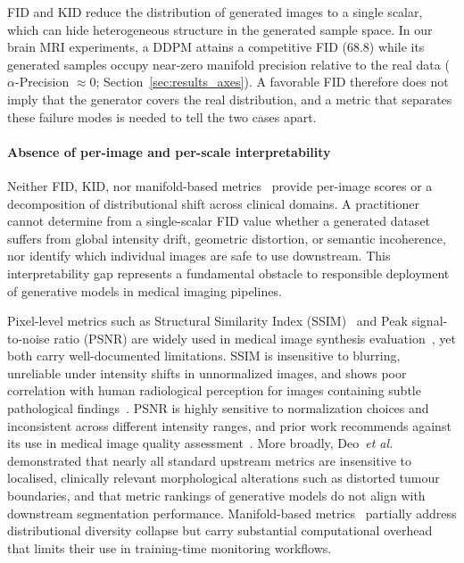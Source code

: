 \documentclass[lettersize,journal]{IEEEtran}
\begin{document}
FID and KID reduce the distribution of generated images to a single scalar, which can hide heterogeneous structure in the generated sample space. In our brain MRI experiments, a DDPM attains a competitive FID ($68.8$) while its generated samples occupy near-zero manifold precision relative to the real data ($\alpha$-Precision $\approx 0$; Section~\ref{sec:results_axes}). A favorable FID therefore does not imply that the generator covers the real distribution, and a metric that separates these failure modes is needed to tell the two cases apart.

\paragraph{Absence of per-image and per-scale interpretability}
Neither FID, KID, nor manifold-based
metrics~\cite{kynkaanniemi2019pr,naeem2020reliable} provide per-image
scores or a decomposition of distributional shift across clinical
domains. A practitioner cannot determine from a single-scalar FID
value whether a generated dataset suffers from global intensity
drift, geometric distortion, or semantic incoherence, nor identify
which individual images are safe to use downstream. This
interpretability gap represents a fundamental obstacle to
responsible deployment of generative models in medical imaging
pipelines.

Pixel-level metrics such as Structural Similarity Index (SSIM)~\cite{wang2004image} and Peak signal-to-noise ratio (PSNR) are
widely used in medical image synthesis
evaluation~\cite{dohmen2025similarity}, yet both carry well-documented
limitations. SSIM is insensitive to blurring, unreliable under
intensity shifts in unnormalized images, and shows poor correlation
with human radiological perception for images containing subtle
pathological findings~\cite{breger2025study,dohmen2025similarity}.
PSNR is highly sensitive to normalization choices and inconsistent
across different intensity ranges, and prior work recommends against
its use in medical image quality
assessment~\cite{dohmen2025similarity}. More broadly,
Deo~\textit{et al.}~\cite{deo2025metrics} demonstrated that nearly
all standard upstream metrics are insensitive to localised,
clinically relevant morphological alterations such as distorted
tumour boundaries, and that metric rankings of generative models do
not align with downstream segmentation performance.
Manifold-based metrics~\cite{kynkaanniemi2019pr,naeem2020reliable}
partially address distributional diversity collapse but carry
substantial computational overhead that limits their use in
training-time monitoring workflows.
\end{document}
